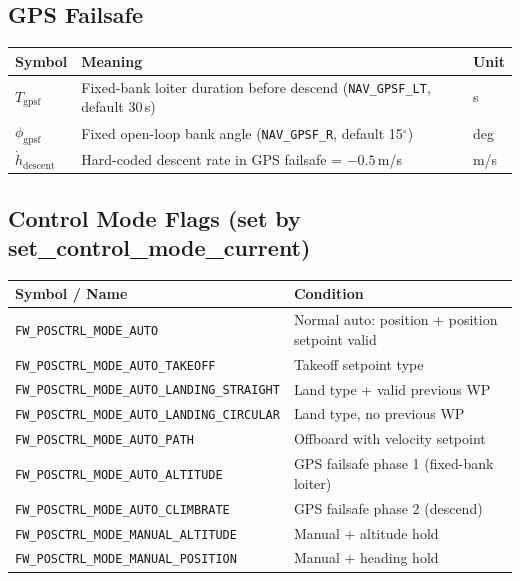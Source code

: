 \documentclass[12pt,a4paper]{article}
\begin{document}
\subsection*{GPS Failsafe}
\begin{center}\begin{tabular}{lll}\toprule
Symbol & Meaning & Unit \\\midrule
$T_{\text{gpsf}}$ & Fixed-bank loiter duration before descend (\texttt{NAV\_GPSF\_LT}, default 30\,s) & s \\
$\phi_{\text{gpsf}}$ & Fixed open-loop bank angle (\texttt{NAV\_GPSF\_R}, default 15$^\circ$) & deg \\
$\dot{h}_{\text{descent}}$ & Hard-coded descent rate in GPS failsafe = $-0.5$\,m/s & m/s \\
\bottomrule\end{tabular}\end{center}

\subsection*{Control Mode Flags (set by set\_control\_mode\_current)}
\begin{center}\begin{tabular}{ll}\toprule
Symbol / Name & Condition \\\midrule
\texttt{FW\_POSCTRL\_MODE\_AUTO} & Normal auto: position + position setpoint valid \\
\texttt{FW\_POSCTRL\_MODE\_AUTO\_TAKEOFF} & Takeoff setpoint type \\
\texttt{FW\_POSCTRL\_MODE\_AUTO\_LANDING\_STRAIGHT} & Land type + valid previous WP \\
\texttt{FW\_POSCTRL\_MODE\_AUTO\_LANDING\_CIRCULAR} & Land type, no previous WP \\
\texttt{FW\_POSCTRL\_MODE\_AUTO\_PATH} & Offboard with velocity setpoint \\
\texttt{FW\_POSCTRL\_MODE\_AUTO\_ALTITUDE} & GPS failsafe phase 1 (fixed-bank loiter) \\
\texttt{FW\_POSCTRL\_MODE\_AUTO\_CLIMBRATE} & GPS failsafe phase 2 (descend) \\
\texttt{FW\_POSCTRL\_MODE\_MANUAL\_ALTITUDE} & Manual + altitude hold \\
\texttt{FW\_POSCTRL\_MODE\_MANUAL\_POSITION} & Manual + heading hold \\
\bottomrule\end{tabular}\end{center}
\end{document}
